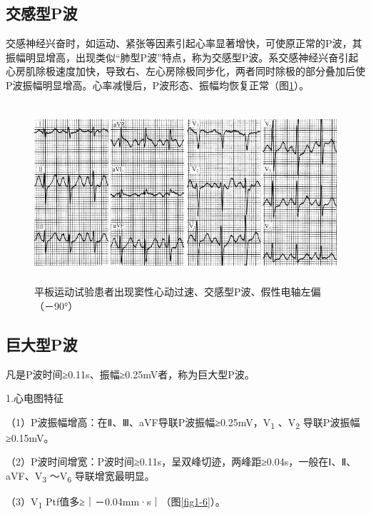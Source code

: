 \protect\hypertarget{text00007.htmlux5cux23subid7}{}{}

\subsection{交感型P波}

交感神经兴奋时，如运动、紧张等因素引起心率显著增快，可使原正常的P波，其振幅明显增高，出现类似“肺型P波”特点，称为交感型P波。系交感神经兴奋引起心房肌除极速度加快，导致右、左心房除极同步化，两者同时除极的部分叠加后使P波振幅明显增高。心率减慢后，P波形态、振幅均恢复正常（图\ref{fig1-5}）。

\begin{figure}[!htbp]
 \centering
 \includegraphics[width=5.42708in,height=2.61458in]{./images/Image00010.jpg}
 \captionsetup{justification=centering}
 \caption{平板运动试验患者出现窦性心动过速、交感型P波、假性电轴左偏（－90°）}
 \label{fig1-5}
  \end{figure} 

\protect\hypertarget{text00007.htmlux5cux23subid8}{}{}

\subsection{巨大型P波}

凡是P波时间≥0.11s、振幅≥0.25mV者，称为巨大型P波。

1.心电图特征

（1）P波振幅增高：在Ⅱ、Ⅲ、aVF导联P波振幅≥0.25mV，V\textsubscript{1}
、V\textsubscript{2} 导联P波振幅≥0.15mV。

（2）P波时间增宽：P波时间≥0.11s，呈双峰切迹，两峰距≥0.04s，一般在Ⅰ、Ⅱ、aVF、V\textsubscript{3}
～V\textsubscript{6} 导联增宽最明显。

（3）V\textsubscript{1} Ptf值多≥｜－0.04mm·s｜（图\ref{fig1-6}）。

